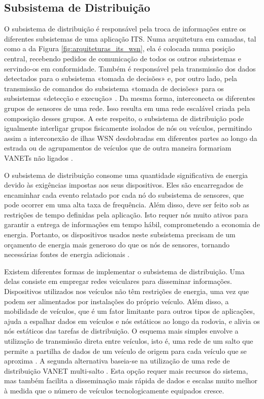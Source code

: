 \documentclass[
	12pt,				%
	oneside,			%
	a4paper,			%
	english,			%
	brazil				%
	]{abntex2ppgsi}
\begin{document}
\subsection{Subsistema de Distribuição}

O subsistema de distribuição é responsável pela troca de informações entre os diferentes subsistemas de uma aplicação ITS. Numa arquitetura em camadas, tal como a da Figura \ref{fig:arquiteturas_its_wsn}, ela é colocada numa posição central, recebendo pedidos de comunicação de todos os outros subsistemas e servindo-os em conformidade. Também é responsável pela transmissão dos dados detectados para o subsistema «tomada de decisões» e, por outro lado, pela transmissão de comandos do subsistema «tomada de decisões» para os subsistemas «detecção e execução» \cite{sung2007collision}. Da mesma forma, interconecta os diferentes grupos de sensores de uma rede. Isso resulta em uma rede escalável criada pela composição desses grupos. A este respeito, o subsistema de distribuição pode igualmente interligar grupos fisicamente isolados de nós ou veículos, permitindo assim a interconexão de ilhas WSN desdobradas em diferentes partes ao longo da estrada \cite{weingartner2007prototype} ou de agrupamentos de veículos que de outra maneira formariam VANETs não ligados \cite{tripp2010performance} .

O subsistema de distribuição consome uma quantidade significativa de energia devido às exigências impostas aos seus dispositivos. Eles são encarregados de encaminhar cada evento relatado por cada nó do subsistema de sensores, que pode ocorrer em uma alta taxa de frequência. Além disso, deve ser feito sob as restrições de tempo definidas pela aplicação. Isto requer nós muito ativos para garantir a entrega de informações em tempo hábil, comprometendo a economia de energia. Portanto, os dispositivos usados neste subsistema precisam de um orçamento de energia mais generoso do que os nós de sensores, tornando necessárias fontes de energia adicionais \cite{losilla2011comprehensive}.

Existem diferentes formas de implementar o subsistema de distribuição. Uma delas consiste em empregar redes veiculares para disseminar informações. Dispositivos utilizados nos veículos não têm restrições de energia, uma vez que podem ser alimentados por instalações do próprio veículo. Além disso, a mobilidade de veículos, que é um fator limitante para outros tipos de aplicações, ajuda a espalhar dados em veículos e nós estáticos ao longo da rodovia, e alivia os nós estáticos das tarefas de distribuição. O esquema mais simples envolve a utilização de transmissão direta entre veículos, isto é, uma rede de um salto que permite a partilha de dados de um veículo de origem para cada veículo que se aproxima \cite{li2007snms} \cite{miura2006evaluation}. A segunda alternativa baseia-se na utilização de uma rede de distribuição VANET multi-salto \cite{qin2010integrated}. Esta opção requer mais recursos do sistema, mas também facilita a disseminação mais rápida de dados e escalas muito melhor à medida que o número de veículos tecnologicamente equipados cresce.
\end{document}
